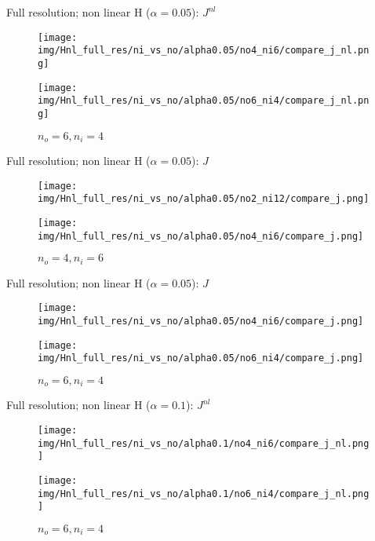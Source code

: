\documentclass[francais]{beamer}
\begin{document}
\begin{frame}{Full resolution; non linear H ($\alpha = 0.05$): $J^{nl}$}
\begin{center}
\begin{figure}
  \texttt{[image: img/Hnl\_full\_res/ni\_vs\_no/alpha0.05/no4\_ni6/compare\_j\_nl.png]}
  \caption{$n_o = 4, n_i = 6$}
\endminipage\hfill
{}
  \texttt{[image: img/Hnl\_full\_res/ni\_vs\_no/alpha0.05/no6\_ni4/compare\_j\_nl.png]}
  \caption{$n_o = 6, n_i = 4$}
\endminipage
\end{figure}
\end{center}
\end{frame}

\begin{frame}{Full resolution; non linear H ($\alpha = 0.05$): $J$}
\begin{center}
\begin{figure}
  \texttt{[image: img/Hnl\_full\_res/ni\_vs\_no/alpha0.05/no2\_ni12/compare\_j.png]}
  \caption{$n_o = 2, n_i = 12$}
\endminipage\hfill
{}
  \texttt{[image: img/Hnl\_full\_res/ni\_vs\_no/alpha0.05/no4\_ni6/compare\_j.png]}
  \caption{$n_o = 4, n_i = 6$}
\endminipage
\end{figure}
\end{center}
\end{frame}

\begin{frame}{Full resolution; non linear H ($\alpha = 0.05$): $J$}
\begin{center}
\begin{figure}
  \texttt{[image: img/Hnl\_full\_res/ni\_vs\_no/alpha0.05/no4\_ni6/compare\_j.png]}
  \caption{$n_o = 4, n_i = 6$}
\endminipage\hfill
{}
  \texttt{[image: img/Hnl\_full\_res/ni\_vs\_no/alpha0.05/no6\_ni4/compare\_j.png]}
  \caption{$n_o = 6, n_i = 4$}
\endminipage
\end{figure}
\end{center}
\end{frame}


\begin{frame}{Full resolution; non linear H ($\alpha = 0.1$): $J^{nl}$}
\begin{center}
\begin{figure}
  \texttt{[image: img/Hnl\_full\_res/ni\_vs\_no/alpha0.1/no4\_ni6/compare\_j\_nl.png]}
  \caption{$n_o = 4, n_i = 6$}
\endminipage\hfill
{}
  \texttt{[image: img/Hnl\_full\_res/ni\_vs\_no/alpha0.1/no6\_ni4/compare\_j\_nl.png]}
  \caption{$n_o = 6, n_i = 4$}
\endminipage
\end{figure}
\end{center}
\end{frame}
\end{document}
